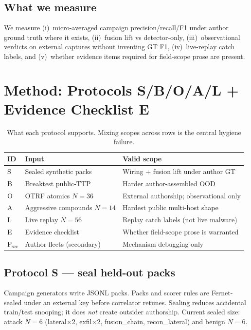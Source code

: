 \documentclass[conference,compsoc]{IEEEtran}
\begin{document}
\subsection{What we measure}
We measure (i)~micro-averaged campaign precision/recall/F1 under author ground
truth where it exists, (ii)~fusion lift vs detector-only, (iii)~observational
verdicts on external captures without inventing GT F1, (iv)~live-replay catch
labels, and (v)~whether evidence items required for field-scope prose are
present.

\section{Method: Protocols S/B/O/A/L + Evidence Checklist E}
\label{sec:method}

\begin{table}[!t]
\caption{What each protocol supports. Mixing scopes across rows is the central
hygiene failure.}
\label{tab:proto}
\centering
\scriptsize
\begin{tabular}{@{}llp{1.75in}@{}}
\toprule
ID & Input & Valid scope \\
\midrule
S & Sealed synthetic packs & Wiring + fusion lift under author GT \\
B & Breaktest public-TTP & Harder author-assembled OOD \\
O & OTRF atomics $N{=}36$ & External authorship; observational only \\
A & Aggressive compounds $N{=}14$ & Hardest public multi-host shape \\
L & Live replay $N{=}56$ & Replay catch labels (not live malware) \\
E & Evidence checklist & Whether field-scope prose is warranted \\
F$_{\mathrm{sec}}$ & Author fleets (secondary) & Mechanism debugging only \\
\bottomrule
\end{tabular}
\end{table}

\subsection{Protocol S --- seal held-out packs}
Campaign generators write JSONL packs.
Packs and scorer rules are Fernet-sealed under an external key before correlator
retunes.
Sealing reduces accidental train/test snooping; it does \emph{not} create
outsider authorship.
Current sealed size: attack $N{=}6$ (lateral$\times$2, exfil$\times$2,
fusion\_chain, recon\_lateral) and benign $N{=}6$.
\end{document}
